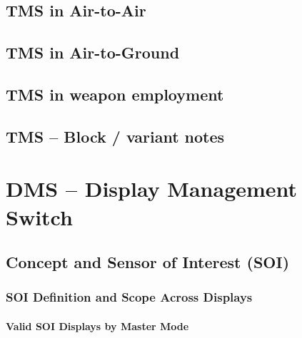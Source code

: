 \documentclass[11pt, a4paper, twoside]{report}
\begin{document}
\section{TMS in Air-to-Air}
\label{sec:C3-S3}

\section{TMS in Air-to-Ground}
\label{sec:C3-S4}

\section{TMS in weapon employment}
\label{sec:C3-S5}

\section{TMS -- Block / variant notes}
\label{sec:C3-S6}

\chapter{DMS -- Display Management Switch}
\label{chap:C4}

\section{Concept and Sensor of Interest (SOI)}
\label{sec:C4-S1}

\subsection{SOI Definition and Scope Across Displays}
\label{sec:C4-S1-S1}

\subsubsection{Valid SOI Displays by Master Mode}
\label{sec:C4-S1-S1-S1}
\end{document}
